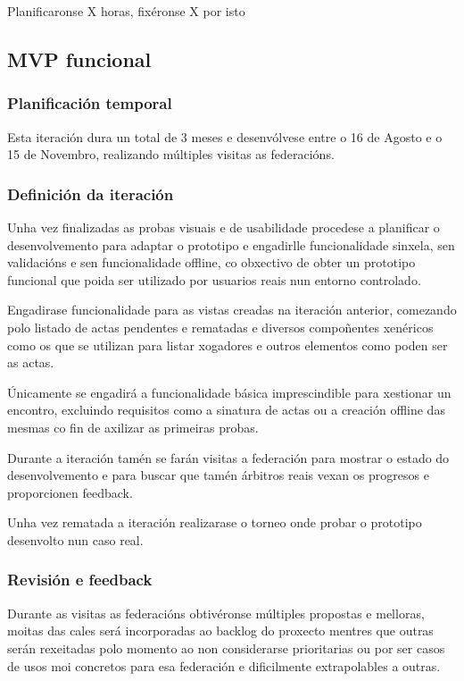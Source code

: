       Planificaronse X horas, fixéronse X por isto

    \subsection{MVP funcional}

      \subsubsection{Planificación temporal}
      Esta iteración dura un total de 3 meses e desenvólvese entre o 16 de 
Agosto e o 15 de Novembro, realizando múltiples visitas as federacións.

      \subsubsection{Definición da iteración}
      Unha vez finalizadas as probas visuais e de usabilidade procedese 
a planificar o desenvolvemento para adaptar o prototipo e engadirlle 
funcionalidade sinxela, sen validacións e sen funcionalidade offline, co 
obxectivo de obter un prototipo funcional que poida ser utilizado por usuarios 
reais nun entorno controlado.

      Engadirase funcionalidade para as vistas creadas na iteración anterior, 
comezando polo listado de actas pendentes e rematadas e diversos compoñentes 
xenéricos como os que se utilizan para listar xogadores e outros elementos como 
poden ser as actas.

      Únicamente se engadirá a funcionalidade básica imprescindible para 
xestionar un encontro, excluindo requisitos como a sinatura de actas ou a 
creación offline das mesmas co fin de axilizar as primeiras probas.

      Durante a iteración tamén se farán visitas a federación para mostrar o 
estado do desenvolvemento e para buscar que tamén árbitros reais vexan os 
progresos e proporcionen feedback.

      Unha vez rematada a iteración realizarase o torneo onde probar o 
prototipo desenvolto nun caso real.

      \subsubsection{Revisión e feedback}
      Durante as visitas as federacións obtivéronse múltiples propostas e 
melloras, moitas das cales será incorporadas ao backlog do proxecto mentres que 
outras serán rexeitadas polo momento ao non considerarse prioritarias ou por 
ser casos de usos moi concretos para esa federación e dificilmente 
extrapolables a outras.

